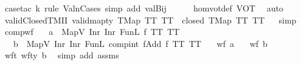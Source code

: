 \begin{isabellebody}
%
\isatagproof
{}\isamarkupfalse%
\ {\isacharparenleft}{\kern0pt}case{\isacharunderscore}{\kern0pt}tac\ k\ rule{\isacharcolon}{\kern0pt}\ ValnCases{\isacharsemicolon}{\kern0pt}\ {\isacharparenleft}{\kern0pt}simp\ add{\isacharcolon}{\kern0pt}\ valBij{}{\isacharparenright}{\kern0pt}{\isacharparenright}{\kern0pt}\isanewline
\ \ \ \ \isamarkupfalse%
\ homvotdef\ VOT\ \isamarkupfalse%
\ auto%
\endisatagproof
{\isafoldproof}%
%
\isadelimproof
\isanewline
%
\endisadelimproof
\isanewline
{}\isamarkupfalse%
\ validClosedTMII{\isacharcolon}{\kern0pt}\ {\isachardoublequoteopen}valid{\isacharunderscore}{\kern0pt}mapty\ {\isacharparenleft}{\kern0pt}TMap\ TT\ TT{\isacharparenright}{\kern0pt}\ {\isasymand}\ closed\ {\isacharparenleft}{\kern0pt}TMap\ TT\ TT{\isacharparenright}{\kern0pt}{\isachardoublequoteclose}%
\isadelimproof
\ %
\endisadelimproof
%
\isatagproof
{}\isamarkupfalse%
\ simp%
\endisatagproof
{\isafoldproof}%
%
\isadelimproof
%
\endisadelimproof
\isanewline
\isanewline
{}\isamarkupfalse%
\ compwf{\isacharcolon}{\kern0pt}\isanewline
\ \ \ {\isachardoublequoteopen}a\ {\isacharequal}{\kern0pt}\ {\isacharparenleft}{\kern0pt}MapV\ {\isacharparenleft}{\kern0pt}Inr\ {\isacharparenleft}{\kern0pt}Inr\ {\isacharparenleft}{\kern0pt}FunL\ f\ TT\ TT{\isacharparenright}{\kern0pt}{\isacharparenright}{\kern0pt}{\isacharparenright}{\kern0pt}{\isacharparenright}{\kern0pt}{\isachardoublequoteclose}\isanewline
\ \ \ {\isachardoublequoteopen}b\ {\isacharequal}{\kern0pt}\ {\isacharparenleft}{\kern0pt}MapV\ {\isacharparenleft}{\kern0pt}Inr\ {\isacharparenleft}{\kern0pt}Inr\ {\isacharparenleft}{\kern0pt}FunL\ {\isacharparenleft}{\kern0pt}compint\ fAdd{}\ f{\isacharparenright}{\kern0pt}\ TT\ TT{\isacharparenright}{\kern0pt}{\isacharparenright}{\kern0pt}{\isacharparenright}{\kern0pt}{\isacharparenright}{\kern0pt}{\isachardoublequoteclose}\isanewline
\ \ \ {\isachardoublequoteopen}wf\ a{\isachardoublequoteclose}\isanewline
\ \ \ {\isachardoublequoteopen}wf\ b{\isachardoublequoteclose}\isanewline
%
\isadelimproof
%
\endisadelimproof
%
\isatagproof
{}\isamarkupfalse%
\ {\isacharminus}{\kern0pt}\isanewline
\ \ \isamarkupfalse%
\ wft{\isacharcolon}{\kern0pt}\ {\isachardoublequoteopen}wf{\isacharunderscore}{\kern0pt}ty\ b{\isachardoublequoteclose}\ \isamarkupfalse%
\ {\isacharparenleft}{\kern0pt}simp\ add{\isacharcolon}{\kern0pt}\ assms{\isacharparenleft}{\kern0pt}{}{\isacharparenright}{\kern0pt}{\isacharparenright}{\kern0pt}\isanewline

\end{isabellebody}
